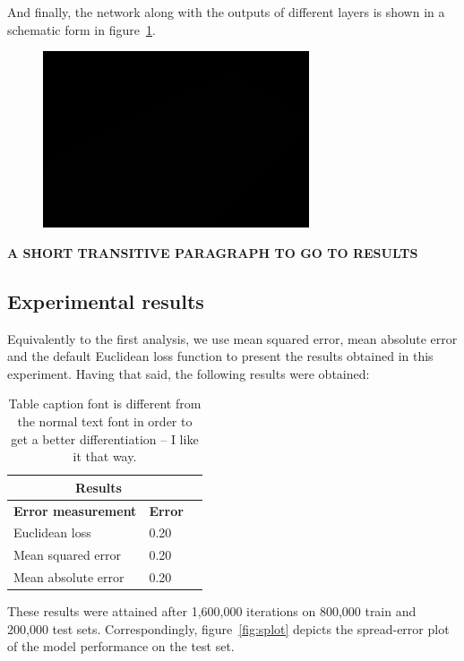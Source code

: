 And finally, the network along with the outputs of different layers is shown in a schematic form in figure~\ref{fig:ucsdout}.

\begin{figure}[H]
	\centering
	{\includegraphics[width=0.7\textwidth]{images/1}}
	\caption{}
	\label{fig:ucsdout}
\end{figure}

\textbf{A SHORT TRANSITIVE PARAGRAPH TO GO TO RESULTS}

\subsection{Experimental results}

Equivalently to the first analysis, we use mean squared error, mean absolute error and the default Euclidean loss function to present the results obtained in this experiment. Having that said, the following results were obtained:

\begin{table}[H]
\centering
\small\sffamily
\begin{tabular}{llr}
\multicolumn{2}{c}{\textbf{\textbf{Results}}} \\
\bottomrule
\textbf{Error measurement}        & \textbf{Error} \\
\bottomrule
Euclidean loss           & 0.20  \\
Mean squared error       & 0.20  \\
Mean absolute error      & 0.20  \\
\bottomrule
\end{tabular}
\caption{Table caption font is different from the normal text font in order to get a better differentiation -- I like it that way.}
\label{tab:res}
\end{table} 

These results were attained after 1,600,000 iterations on 800,000 train and 200,000 test sets. Correspondingly, figure~\ref{fig:splot} depicts the spread-error plot of the model performance on the test set.

